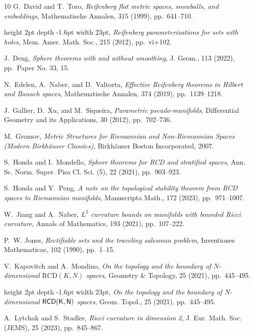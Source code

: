 \documentclass[11pt]{article}
\newcommand{\rcd}{\mathrm{RCD}}
\theoremstyle{plain}
\theoremstyle{definition}
\numberwithin{equation}{section}
\begin{document}
\begin{thebibliography}{10}
{\sc G.~David and T.~Toro}, {\em Reifenberg flat metric spaces, snowballs, and
  embeddings}, Mathematische Annalen, 315 (1999), pp.~641--710.

\leavevmode\vrule height 2pt depth -1.6pt width 23pt, {\em Reifenberg
  parameterizations for sets with holes}, Mem. Amer. Math. Soc., 215 (2012),
  pp.~vi+102.

{\sc J.~Deng}, {\em Sphere theorems with and without smoothing}, J. Geom., 113
  (2022), pp.~Paper No. 33, 15.

{\sc N.~Edelen, A.~Naber, and D.~Valtorta}, {\em Effective {R}eifenberg
  theorems in {H}ilbert and {B}anach spaces}, Mathematische Annalen, 374
  (2019), pp.~1139--1218.

{\sc J.~Gallier, D.~Xu, and M.~Siqueira}, {\em Parametric pseudo-manifolds},
  Differential Geometry and its Applications, 30 (2012), pp.~702--736.

{\sc M.~Gromov}, {\em Metric Structures for {R}iemannian and Non-{R}iemannian
  Spaces (Modern Birkh{\"a}user Classics)}, Birkh{\"a}user Boston Incorporated,
  2007.

{\sc S.~Honda and I.~Mondello}, {\em Sphere theorems for {RCD} and stratified
  spaces}, Ann. Sc. Norm. Super. Pisa Cl. Sci. (5), 22 (2021), pp.~903--923.

{\sc S.~Honda and Y.~Peng}, {\em A note on the topological stability theorem
  from {RCD} spaces to {R}iemannian manifolds}, Manuscripta Math., 172 (2023),
  pp.~971--1007.

{\sc W.~Jiang and A.~Naber}, {\em ${L}^2$ curvature bounds on manifolds with
  bounded {R}icci curvature}, Annals of Mathematics, 193 (2021), pp.~107--222.

{\sc P.~W. Jones}, {\em Rectifiable sets and the traveling salesman problem},
  Inventiones Mathematicae, 102 (1990), pp.~1--15.

{\sc V.~Kapovitch and A.~Mondino}, {\em On the topology and the boundary of
  ${N}$-dimensional $\rcd({K, N})$ spaces}, Geometry \& Topology, 25 (2021),
  pp.~445--495.

\leavevmode\vrule height 2pt depth -1.6pt width 23pt, {\em On the topology and
  the boundary of {$N$}-dimensional {$\sf{RCD}(K,N)$} spaces}, Geom. Topol., 25
  (2021), pp.~445--495.

{\sc A.~Lytchak and S.~Stadler}, {\em Ricci curvature in dimension 2}, J. Eur.
  Math. Soc. (JEMS), 25 (2023), pp.~845--867.


\end{thebibliography}
\end{document}
